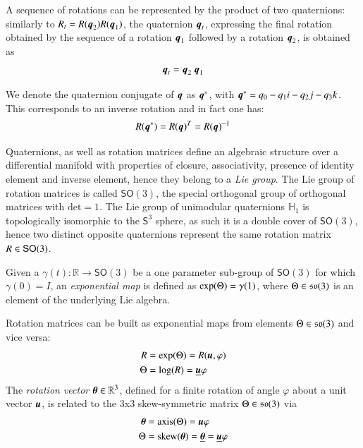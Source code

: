 A sequence of rotations can be represented by the product of two quaternions:
similarly to $R_t=R({\boldsymbol{q}}_{2}) R({\boldsymbol{q}}_{1})$, the quaternion ${\boldsymbol{q}}_{t}$, expressing the final rotation obtained by the sequence of a rotation ${\boldsymbol{q}}_{1}$ followed by a rotation ${\boldsymbol{q}}_{2}$, is obtained as 
\begin{equation}
    {\boldsymbol{q}}_{t}={\boldsymbol{q}}_{2}\: {\boldsymbol{q}}_{1}
\end{equation}

We denote the quaternion conjugate of ${\boldsymbol{q}}$ as ${\boldsymbol{q}}^*$, with ${\boldsymbol{q}}^*= q_0 - q_1 i  - q_2 j -  q_3 k$. This corresponds to an inverse rotation and in fact one has:
\begin{equation}
    {R}({\boldsymbol{q}}^*) = {R}({\boldsymbol{q}})^T = {R}({\boldsymbol{q}})^{-1} 
\end{equation}

Quaternions, as well as rotation matrices define an algebraic structure over a differential manifold with properties of closure, associativity, presence of identity element and inverse element, hence they belong to a \textit{Lie group}. The Lie group of rotation matrices is called $\mathsf{SO}(3)$, the special orthogonal group of orthogonal matrices with $\text{det}=1$. The Lie group of unimodular quaternions $\mathbb{H}_1$ is topologically isomorphic to the $\mathsf{S}^3$ sphere, as such it is a double cover of $\mathsf{SO}(3)$, hence two distinct opposite quaternions represent the same rotation matrix ${R} \in \mathsf{SO}(3)$.

Given a $\gamma(t) : \mathbb{R} \rightarrow \mathsf{SO}(3)$ be a one parameter sub-group of $\mathsf{SO}(3)$ for which $\gamma(0) = I$, an \emph{exponential map} is defined as $\exp({\Theta})=\gamma(1)$, where ${\Theta} \in \mathfrak{so}(3)$ is an element of the underlying Lie algebra. 
	
Rotation matrices can be built as exponential maps from elements ${\Theta} \in \mathfrak{so}(3)$ and vice versa:  
%
\begin{align}
{R}      &= \mathrm{exp}({\Theta})=R({\boldsymbol{u}},\varphi) \label{Rexp}\\
{\Theta} &= \mathrm{log}({R})=\underline{{\boldsymbol{u}}}\varphi \label{Rlog}
\end{align}
%
The \emph{rotation vector} ${\boldsymbol{\theta}} \in \mathbb{R}^3$, defined for a finite rotation of angle $\varphi$ about a unit vector ${\boldsymbol{u}}$, is related to the 3x3 skew-symmetric matrix ${\Theta} \in \mathfrak{so}(3)$ via 
%
\begin{align}
    {\boldsymbol{\theta}} &= \text{axis}({\Theta})={\boldsymbol{u}}\varphi \\ 
    {\Theta} &=  \mathrm{skew}({\boldsymbol{\theta}}) = \underline{{\boldsymbol{\theta}}}=\underline{{\boldsymbol{u}}}\varphi
\end{align}

